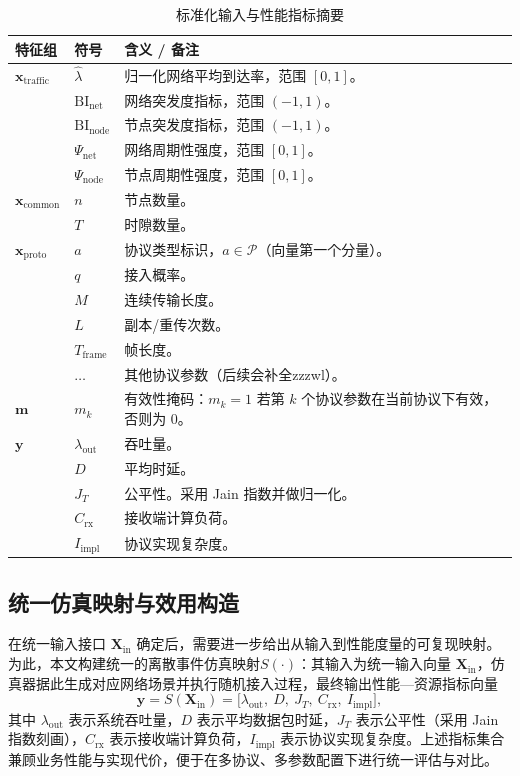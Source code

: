 \begin{table}[t]
	\centering
	\caption{标准化输入与性能指标摘要}
	\label{tab:input_features}
	\renewcommand{\arraystretch}{1.2}
	\begin{tabular}{@{}l l p{9cm}@{}}
	\toprule
		特征组 & 符号 & 含义 / 备注 \\
		\midrule
		$\mathbf{x}_{\text{traffic}}$ & $\hat{\lambda}$ & 归一化网络平均到达率，范围 $[0, 1]$。\\
		& $\mathrm{BI}_{\mathrm{net}}$ & 网络突发度指标，范围 $(-1,1)$。\\
		& $\mathrm{BI}_{\mathrm{node}}$ & 节点突发度指标，范围 $(-1,1)$。\\
		& $\Psi_{\mathrm{net}}$ & 网络周期性强度，范围 $[0,1]$。\\
		& $\Psi_{\mathrm{node}}$ & 节点周期性强度，范围 $[0,1]$。\\
		\midrule
		$\mathbf{x}_{\mathrm{common}}$ & $n$ & 节点数量。\\
		& $T$ & 时隙数量。\\
		\midrule
		$\mathbf{x}_{\mathrm{proto}}$ & $a$ & 协议类型标识，$a\in\mathcal{P}$（向量第一个分量）。\\
		& $q$ & 接入概率。\\
		& $M$ & 连续传输长度。\\
		& $L$ & 副本/重传次数。\\
		& $T_{\mathrm{frame}}$ & 帧长度。\\
		& $\ldots$ & 其他协议参数（后续会补全zzzwl）。\\
		\midrule
		$\mathbf{m}$ & $m_k$ & 有效性掩码：$m_k=1$ 若第 $k$ 个协议参数在当前协议下有效，否则为 $0$。\\
		\midrule
		$\mathbf{y}$ & $\lambda_{\mathrm{out}}$ & 吞吐量。\\
		& $D$ & 平均时延。\\
		& $J_T$ & 公平性。采用 Jain 指数并做归一化。\\
		& $C_{\mathrm{rx}}$ & 接收端计算负荷。\\
		& $I_{\mathrm{impl}}$ & 协议实现复杂度。\\
		\bottomrule
	\end{tabular}
\end{table}

\subsection{统一仿真映射与效用构造}

在统一输入接口 $\mathbf{X}_{\mathrm{in}}$ 确定后，需要进一步给出从输入到性能度量的可复现映射。为此，本文构建统一的离散事件仿真映射$S(\cdot)$：其输入为统一输入向量 $\mathbf{X}_{\mathrm{in}}$，仿真器据此生成对应网络场景并执行随机接入过程，最终输出性能—资源指标向量
\begin{equation}
	\mathbf{y}=S\!\left(\mathbf{X}_{\mathrm{in}}\right)
	=\big[\lambda_{\mathrm{out}},\ D,\ J_T,\ C_{\mathrm{rx}},\ I_{\mathrm{impl}}\big],
\end{equation}
其中 $\lambda_{\mathrm{out}}$ 表示系统吞吐量，$D$ 表示平均数据包时延，$J_T$ 表示公平性（采用 Jain 指数刻画），$C_{\mathrm{rx}}$ 表示接收端计算负荷，$I_{\mathrm{impl}}$ 表示协议实现复杂度。上述指标集合兼顾业务性能与实现代价，便于在多协议、多参数配置下进行统一评估与对比。

